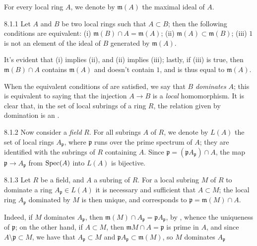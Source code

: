 \documentclass[../main.tex]{subfiles}
\begin{document}
For every local ring $A$, we denote by $\mathfrak{m}(A)$ the maximal ideal of
$A$.

\begin{env}[Lemma]{8.1.1}
Let $A$ and $B$ be two local rings such that $A\subset B$;
then the following conditions are equivalent: (i)
$\mathfrak{m}(B)\cap A=\mathfrak{m}(A)$; (ii)
$\mathfrak{m}(A)\subset\mathfrak{m}(B)$; (iii) $1$ is not an element of
the ideal of $B$ generated by $\mathfrak{m}(A)$.
\end{env}

It's evident that (i) implies (ii), and (ii) implies (iii); lastly, if (iii) is
true, then $\mathfrak{m}(B)\cap A$ contains $\mathfrak{m}(A)$ and doesn't
contain $1$, and is thus equal to $\mathfrak{m}(A)$.

When the equivalent conditions of  are satisfied, we say that $B$
\emph{dominates} $A$; this is equivalent to saying that the injection $A\to B$
is a \emph{local} homomorphism. It is clear that, in the set of local subrings
of a ring $R$, the relation given by domination is an .

\begin{env}{8.1.2}
Now consider a \emph{field} $R$. For all subrings $A$ of
$R$, we denote by $L(A)$ the set of local rings $A_\mathfrak{p}$, where
$\mathfrak{p}$ runs over the prime spectrum of $A$; they are identified with the
subrings of $R$ containing $A$. Since
$\mathfrak{p}=(\mathfrak{p}A_\mathfrak{p})\cap A$, the map $\mathfrak{p}\to
A_\mathfrak{p}$ from $\operatorname{Spec}(A)$ into $L(A)$ is bijective.
\end{env}

\begin{env}[Lemma]{8.1.3}
Let $R$ be a field, and $A$ a subring of $R$. For a
local subring $M$ of $R$ to dominate a ring $A_\mathfrak{p}\in L(A)$ it is
necessary and sufficient that $A\subset M$; the local ring $A_\mathfrak{p}$
dominated by $M$ is then unique, and corresponds to
$\mathfrak{p}=\mathfrak{m}(M)\cap A$.
\end{env}

Indeed, if $M$ dominates $A_\mathfrak{p}$, then $\mathfrak{m}(M)\cap
A_\mathfrak{p}=\mathfrak{p}A_\mathfrak{p}$, by , whence the
uniqueness of $\mathfrak{p}$; on the other hand, if $A\subset M$, then
$\mathfrak{m}M\cap A=\mathfrak{p}$ is prime in $A$, and since
$A\setminus\mathfrak{p}\subset M$, we have that $A_\mathfrak{p}\subset M$ and
$\mathfrak{p}A_\mathfrak{p}\subset\mathfrak{m}(M)$, so $M$ dominates
$A_\mathfrak{p}$
\end{document}
